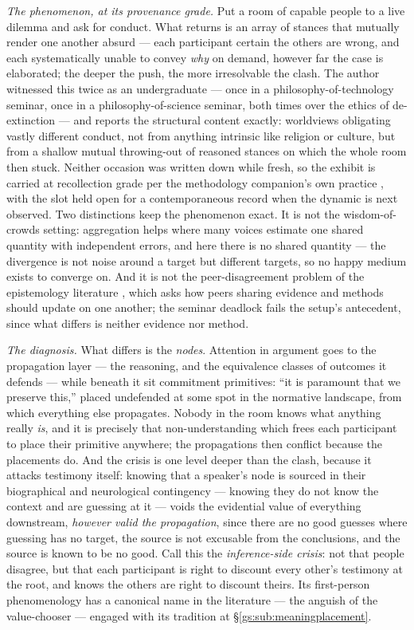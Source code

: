 \documentclass[11pt]{article}
\numberwithin{equation}{section}
\theoremstyle{plain}
\theoremstyle{definition}
\theoremstyle{remark}
\begin{document}
\emph{The phenomenon, at its provenance grade.} Put a room of capable
people to a live dilemma and ask for conduct. What returns is an array
of stances that mutually render one another absurd --- each participant
certain the others are wrong, and each systematically unable to convey
\emph{why} on demand, however far the case is elaborated; the deeper
the push, the more irresolvable the clash. The author witnessed this
twice as an undergraduate --- once in a philosophy-of-technology
seminar, once in a philosophy-of-science seminar, both times over the
ethics of de-extinction --- and reports the structural content
exactly: worldviews obligating vastly different conduct, not from
anything intrinsic like religion or culture, but from a shallow mutual
throwing-out of reasoned stances on which the whole room then stuck.
Neither occasion was written down while fresh, so the exhibit is
carried at recollection grade per the methodology companion's own
practice \cite{Ben26Method}, with the slot held open for a
contemporaneous record when the dynamic is next observed. Two
distinctions keep the phenomenon exact. It is not the
wisdom-of-crowds setting: aggregation helps where many voices estimate
one shared quantity with independent errors, and here there is no
shared quantity --- the divergence is not noise around a target but
different targets, so no happy medium exists to converge on. And it is
not the peer-disagreement problem of the epistemology literature
\cite{Chr07}, which asks how peers sharing evidence and methods should
update on one another; the seminar deadlock fails the setup's
antecedent, since what differs is neither evidence nor method.

\emph{The diagnosis.} What differs is the \emph{nodes}. Attention in
argument goes to the propagation layer --- the reasoning, and the
equivalence classes of outcomes it defends --- while beneath it sit
commitment primitives: ``it is paramount that we preserve this,''
placed undefended at some spot in the normative landscape, from which
everything else propagates. Nobody in the room knows what anything
really \emph{is}, and it is precisely that non-understanding which
frees each participant to place their primitive anywhere; the
propagations then conflict because the placements do. And the crisis
is one level deeper than the clash, because it attacks testimony
itself: knowing that a speaker's node is sourced in their biographical
and neurological contingency --- knowing they do not know the context
and are guessing at it --- voids the evidential value of everything
downstream, \emph{however valid the propagation}, since there are no
good guesses where guessing has no target, the source is not excusable
from the conclusions, and the source is known to be no good. Call this
the \emph{inference-side crisis}: not that people disagree, but that
each participant is right to discount every other's testimony at the
root, and knows the others are right to discount theirs. Its
first-person phenomenology has a canonical name in the literature ---
the anguish of the value-chooser \cite{Sartre46} --- engaged with its
tradition at \S\ref{gs:sub:meaningplacement}.
\end{document}
